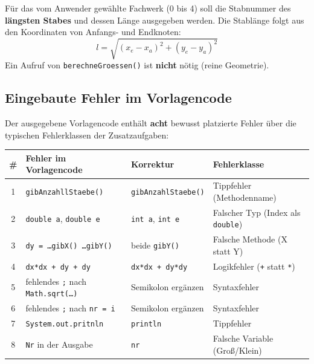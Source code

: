 \documentclass[
	fontsize=12pt,          %
	paper=a4,               %
	numbers=noenddot,       %
	listof=totoc,           %
	listof=entryprefix,     %
	listof=nochaptergap,    %
	bibliography=totoc,     %
	parskip=half            %
	openany                 %
]{scrbook}
\begin{document}
Für das vom Anwender gewählte Fachwerk (0 bis 4) soll die Stabnummer des \textbf{längsten Stabes} und dessen Länge ausgegeben werden. Die Stablänge folgt aus den Koordinaten von Anfangs- und Endknoten:
\[
	l = \sqrt{(x_e - x_a)^2 + (y_e - y_a)^2}
\]
Ein Aufruf von \texttt{berechneGroessen()} ist \textbf{nicht} nötig (reine Geometrie).

\subsection*{Eingebaute Fehler im Vorlagencode}

Der ausgegebene Vorlagencode enthält \textbf{acht} bewusst platzierte Fehler über die typischen Fehlerklassen der Zusatzaufgaben:

\begin{center}
\small
\renewcommand{\arraystretch}{1.3}
\begin{tabularx}{\textwidth}{@{}c >{\raggedright\arraybackslash}X >{\raggedright\arraybackslash}X >{\raggedright\arraybackslash}X@{}}
	\toprule
	\textbf{\#} & \textbf{Fehler im Vorlagencode} & \textbf{Korrektur} & \textbf{Fehlerklasse} \\
	\midrule
	1 & \texttt{gibAnzahllStaebe()} & \texttt{gibAnzahlStaebe()} & Tippfehler (Methodenname) \\
	2 & \texttt{double a}, \texttt{double e} & \texttt{int a}, \texttt{int e} & Falscher Typ (Index als \texttt{double}) \\
	3 & \texttt{dy = \dots gibX() \dots gibY()} & beide \texttt{gibY()} & Falsche Methode (X statt Y) \\
	4 & \texttt{dx*dx + dy + dy} & \texttt{dx*dx + dy*dy} & Logikfehler (\texttt{+} statt \texttt{*}) \\
	5 & fehlendes \texttt{;} nach \texttt{Math.sqrt(\dots)} & Semikolon ergänzen & Syntaxfehler \\
	6 & fehlendes \texttt{;} nach \texttt{nr = i} & Semikolon ergänzen & Syntaxfehler \\
	7 & \texttt{System.out.pritnln} & \texttt{println} & Tippfehler \\
	8 & \texttt{Nr} in der Ausgabe & \texttt{nr} & Falsche Variable (Groß/Klein) \\
	\bottomrule
\end{tabularx}
\end{center}
\end{document}
